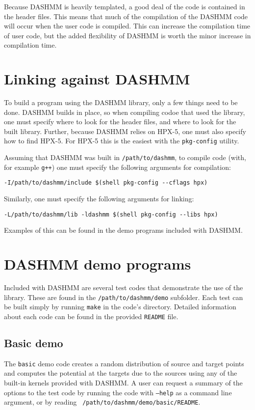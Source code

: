 Because DASHMM is heavily templated, a good deal of the code is
contained in the header files. This means that much of the compilation
of the DASHMM code will occur when the user code is compiled. This can
increase the compilation time of user code, but the added flexibility
of DASHMM is worth the minor increase in compilation time.

\section{Linking against DASHMM}

To build a program using the DASHMM library, only a few things need to
be done. DASHMM builds in place, so when compiling codoe that used the
library, one must specify where to look for the header files, and
where to look for the built library. Further, because DASHMM relies on
HPX-5, one must also specify how to find HPX-5. For HPX-5 this is the
easiest with the {\tt pkg-config} utility.

Assuming that DASHMM was built in {\tt /path/to/dashmm}, to compile
code (with, for example {\tt g++}) one must specify the following
arguments for compilation:

\begin{verbatim}
-I/path/to/dashmm/include $(shell pkg-config --cflags hpx)
\end{verbatim}

\noindent Similarly, one must specify the following arguments for linking:

\begin{verbatim}
-L/path/to/dashmm/lib -ldashmm $(shell pkg-config --libs hpx)
\end{verbatim}

\noindent Examples of this can be found in the demo programs included with
DASHMM.

\section{DASHMM demo programs}

Included with DASHMM are several test codes that demonstrate the use
of the library. These are found in the {\tt /path/to/dashmm/demo}
subfolder. Each test can be built simply by running {\tt make} in the
code's directory. Detailed information about each code can be found in
the provided {\tt README} file.

\subsection{Basic demo}
The {\tt basic} demo code creates a random distribution of source and
target points and computes the potential at the targets due to the
sources using any of the built-in kernels provided with DASHMM. A user
can request a summary of the options to the test code by running the
code with {\tt --help} as a command line argument, or by reading {\tt
  /path/to/dashmm/demo/basic/README}.

